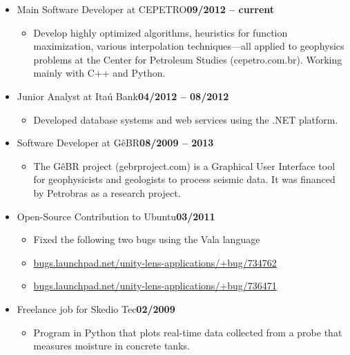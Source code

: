 \documentclass[10pt]{article}
\newenvironment{outerlist}[1][\enskip\textbullet]%
        {\begin{itemize}[#1,leftmargin=*]}{\end{itemize}%
         \vspace{-.6\baselineskip}}
\newenvironment{innerlist}[1][\enskip\textbullet]%
        {\begin{itemize}[#1,leftmargin=*,parsep=0pt,itemsep=0pt,topsep=0pt,partopsep=0pt]}
        {\end{itemize}}
\begin{document}
\begin{outerlist}

\item[] Main Software Developer at CEPETRO\hfill {\bf 09/2012 -- current}
  \begin{innerlist}
  \item Develop highly optimized algorithms, heuristics for function
maximization, various interpolation techniques---all applied to geophysics
problems at the Center for Petroleum Studies (cepetro.com.br). Working mainly
with C++ and Python.
  
  \end{innerlist}

\item[] Junior Analyst at Itaú Bank\hfill {\bf 04/2012 -- 08/2012}
  \begin{innerlist}
  \item Developed database systems and web services using the .NET platform.
  \end{innerlist}

\item[] Software Developer at GêBR\hfill {\bf 08/2009 -- 2013}
  \begin{innerlist}
  \item The GêBR project (gebrproject.com) is a Graphical User
  Interface tool for geophysicists and geologists to process seismic data. It
  was financed by Petrobras as a research project.
  \end{innerlist}

\item[] Open-Source Contribution to Ubuntu\hfill {\bf 03/2011}
  \begin{innerlist}
  \item Fixed the following two bugs using the Vala language
  \item \href{https://bugs.launchpad.net/unity-lens-applications/+bug/734762}{bugs.launchpad.net/unity-lens-applications/+bug/734762}
  \item \href{https://bugs.launchpad.net/unity-lens-applications/+bug/736471}{bugs.launchpad.net/unity-lens-applications/+bug/736471}
  \end{innerlist}

\item[] Freelance job for {\sc Skedio Tec}\hfill {\bf 02/2009}
  \begin{innerlist}
  \item Program in Python that plots real-time data collected from a probe that
  measures moisture in concrete tanks.
  \end{innerlist}


\end{outerlist}
\end{document}
